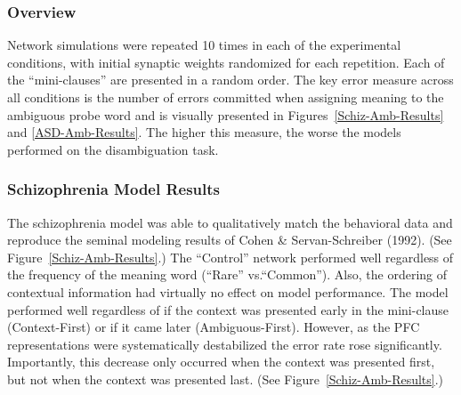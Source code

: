 \subsubsection{Overview}
Network simulations were repeated 10 times in each of the experimental conditions, with initial synaptic weights randomized for each repetition. Each of the ``mini-clauses'' are presented in a random order. The key error measure across all conditions is the number of errors committed when assigning meaning to the ambiguous probe word and is visually presented in Figures~\ref{Schiz-Amb-Results} and \ref{ASD-Amb-Results}. The higher this measure, the worse the models performed on the disambiguation task.  

\subsubsection{Schizophrenia Model Results}
The schizophrenia model was able to qualitatively match the behavioral data and reproduce the seminal modeling results of Cohen \& Servan-Schreiber (1992). (See Figure~\ref{Schiz-Amb-Results}.)  The ``Control'' network performed well regardless of the frequency of the meaning word (``Rare'' vs.``Common'').   Also, the ordering of contextual information had virtually no effect on model performance.  The model performed well regardless of if the context was presented early in the mini-clause (Context-First) or if it came later (Ambiguous-First).  However, as the PFC representations were systematically destabilized the error rate rose significantly. Importantly, this decrease only occurred when the context was presented first, but not when the context was presented last.  (See Figure~\ref{Schiz-Amb-Results}.)  
